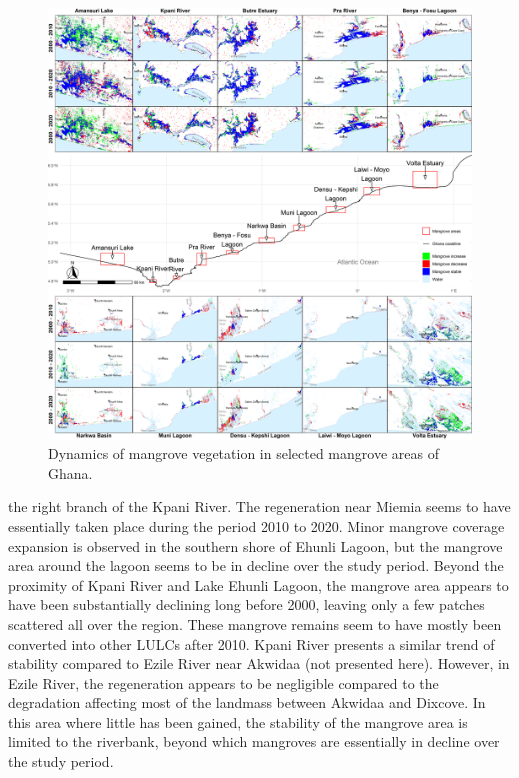 \documentclass[12pt,oneside,preprint,3p,authoryear,times]{elsarticle} %
\begin{document}
\begin{figure}[!htbp]

{\centering \includegraphics[width=1\linewidth,]{figures/pngs/Ghana_mangrove_change_direction} 

}

\caption{Dynamics of mangrove vegetation in selected mangrove areas of Ghana.}\label{fig:fig6}
\end{figure}

\noindent the right branch of the Kpani River. The regeneration near
Miemia seems to have essentially taken place during the period 2010 to
2020. Minor mangrove coverage expansion is observed in the southern
shore of Ehunli Lagoon, but the mangrove area around the lagoon seems to
be in decline over the study period. Beyond the proximity of Kpani River
and Lake Ehunli Lagoon, the mangrove area appears to have been
substantially declining long before 2000, leaving only a few patches
scattered all over the region. These mangrove remains seem to have
mostly been converted into other LULCs after 2010. Kpani River presents
a similar trend of stability compared to Ezile River near Akwidaa (not
presented here). However, in Ezile River, the regeneration appears to be
negligible compared to the degradation affecting most of the landmass
between Akwidaa and Dixcove. In this area where little has been gained,
the stability of the mangrove area is limited to the riverbank, beyond
which mangroves are essentially in decline over the study period.
\end{document}
